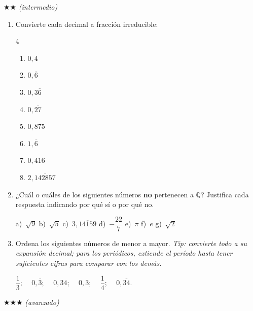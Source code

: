 \documentclass[11pt, letterpaper]{article}
\begin{document}
$\bigstar\bigstar$ \textit{(intermedio)}

\begin{enumerate}[label=\textbf{\arabic*.}, leftmargin=*, resume]

\item Convierte cada decimal a fracci\'on irreducible:
\begin{multicols}{4}
\begin{enumerate}[label=\alph*)]
  \item $0{,}4$ \item $0{,}\overline{6}$ \item $0{,}3\overline{6}$ \item $0{,}\overline{27}$
  \item $0{,}875$ \item $1{,}\overline{6}$ \item $0{,}41\overline{6}$ \item $2{,}\overline{142857}$
\end{enumerate}
\end{multicols}

\item ¿Cu\'al o cu\'ales de los siguientes n\'umeros \textbf{no} pertenecen a $\mathbb{Q}$? Justifica cada respuesta indicando por qu\'e sí o por qu\'e no.

\noindent a)~$\sqrt{9}$ \quad b)~$\sqrt{5}$ \quad c)~$3{,}\overline{14159}$ \quad d)~$-\dfrac{22}{7}$ \quad e)~$\pi$ \quad f)~$e$ \quad g)~$\sqrt{2}$

\item Ordena los siguientes n\'umeros de menor a mayor. \textit{Tip: convierte todo a su expansi\'on decimal; para los peri\'odicos, extiende el per\'iodo hasta tener suficientes cifras para comparar con los dem\'as.}

\noindent $\dfrac{1}{3}$; $\quad 0{,}\overline{3}$; $\quad 0{,}34$; $\quad 0{,}3$; $\quad \dfrac{1}{4}$; $\quad 0{,}\overline{34}$.


\end{enumerate}

$\bigstar\bigstar\bigstar$ \textit{(avanzado)}
\end{document}
